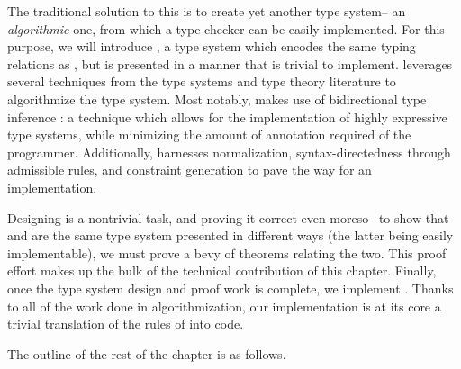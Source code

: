 The traditional solution to this is to create yet another type system-- an \textit{algorithmic} one, from which a type-checker can be easily implemented. For this purpose, we will introduce \bilambdaamor, a type system which encodes the same typing relations as \dlambdaamor, but is presented in a manner that is trivial to implement. \bilambdaamor leverages several techniques from the type systems and type theory literature to algorithmize the \dlambdaamor type system. Most notably, \bilambdaamor makes use of bidirectional type inference \cite{pierce-and-turner:lti}: a technique which allows for the implementation of highly expressive type systems, while minimizing the amount of annotation required of the programmer. Additionally, \bilambdaamor harnesses normalization, syntax-directedness through admissible rules, and constraint generation to pave the way for an implementation.

Designing \bilambdaamor is a nontrivial task, and proving it correct even moreso-- to show that \dlambdaamor and \bilambdaamor are the same type system presented in different ways (the latter being easily implementable), we must prove a bevy of theorems relating the two. This proof effort makes up the bulk of the technical contribution of this chapter. Finally, once the type system design and proof work is complete, we implement \bilambdaamor. Thanks to all of the work done in algorithmization, our implementation is at its core a trivial translation of the rules of \bilambdaamor into code.

The outline of the rest of the chapter is as follows.


